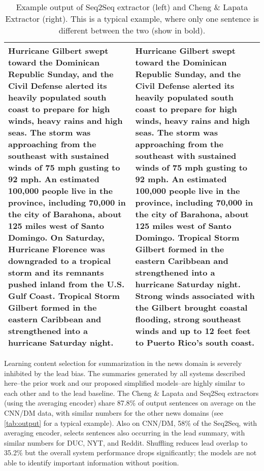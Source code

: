 
\begin{table*}
\centering
  \begin{tabular}{p{20em} p{20em}}
\toprule
Hurricane Gilbert swept toward the Dominican Republic Sunday, and the 
   Civil Defense alerted its heavily populated south coast to prepare 
   for high winds, heavy rains and high seas.                         
The storm was approaching from the southeast with sustained winds of  
   75 mph gusting to 92 mph.                                          
An estimated 100,000 people live in the province, including 70,000 in 
   the city of Barahona, about 125 miles west of Santo Domingo.       
\textbf{On Saturday, Hurricane Florence was downgraded to a tropical storm and
   its remnants pushed inland from the U.S. Gulf Coast.}               
Tropical Storm Gilbert formed in the eastern Caribbean and            
   strengthened into a hurricane Saturday night.  
&
Hurricane Gilbert swept toward the Dominican Republic Sunday, and the 
   Civil Defense alerted its heavily populated south coast to prepare 
   for high winds, heavy rains and high seas.                         
The storm was approaching from the southeast with sustained winds of  
   75 mph gusting to 92 mph.                                          
An estimated 100,000 people live in the province, including 70,000 in 
   the city of Barahona, about 125 miles west of Santo Domingo.       
Tropical Storm Gilbert formed in the eastern Caribbean and            
   strengthened into a hurricane Saturday night.                      
\textbf{Strong winds associated with the Gilbert brought coastal flooding,    
   strong southeast winds and up to 12 feet feet to Puerto Rico's     
   south coast.}   \\
\bottomrule
\end{tabular}
\caption{Example output of Seq2Seq extractor (left) and Cheng 
\& Lapata Extractor (right). This is a typical example, where only one
 sentence is different between the two (show in bold). }
\label{tab:output}
\end{table*}

Learning content selection for summarization in the news domain is severely inhibited by the lead bias. 
The summaries generated by all systems described here--the prior work and our proposed simplified models--are highly similar to each other and to the lead 
baseline. The Cheng \& Lapata and Seq2Seq 
extractors (using the averaging encoder) share 87.8\% of output sentences on average on the CNN/DM data,
with similar numbers for the other news domains (see \autoref{tab:output}
for a typical example).  
Also on CNN/DM, 58\% of the Seq2Seq, with averaging encoder, selects sentences also occurring
in the lead summary, with similar numbers for DUC, NYT, and Reddit. Shuffling
reduces lead overlap to 35.2\% but the overall system performance drops
    significantly; the models are not able to identify important information
    without position.
    

